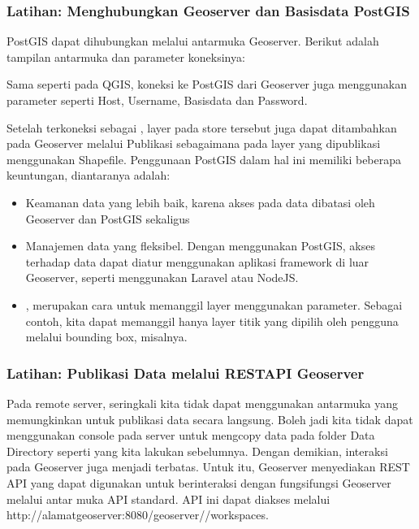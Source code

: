 \documentclass[letterpaper,10pt,english]{sphinxmanual}
\begin{document}
\subsubsection{Latihan: Menghubungkan Geoserver dan Basisdata PostGIS}
\label{\detokenize{sesi3/publikasi:latihan-menghubungkan-geoserver-dan-basisdata-postgis}}
PostGIS dapat dihubungkan melalui antarmuka Geoserver. Berikut adalah tampilan antarmuka dan parameter koneksinya:


Sama seperti pada QGIS, koneksi ke PostGIS dari Geoserver juga menggunakan parameter seperti Host, Username, Basisdata dan Password.

Setelah terkoneksi sebagai , layer pada store tersebut juga dapat ditambahkan pada Geoserver melalui Publikasi sebagaimana pada layer yang dipublikasi menggunakan Shapefile. Penggunaan PostGIS dalam hal ini memiliki beberapa keuntungan, diantaranya adalah:
\begin{itemize}
\item {} 
Keamanan data yang lebih baik, karena akses pada data dibatasi oleh Geoserver dan PostGIS sekaligus

\item {} 
Manajemen data yang fleksibel. Dengan menggunakan PostGIS, akses terhadap data dapat diatur menggunakan aplikasi framework di luar Geoserver, seperti menggunakan Laravel atau NodeJS.

\item {} 
, merupakan cara untuk memanggil layer menggunakan parameter. Sebagai contoh, kita dapat memanggil hanya layer titik yang dipilih oleh pengguna melalui bounding box, misalnya.

\end{itemize}


\subsubsection{Latihan: Publikasi Data melalui REST\sphinxhyphen{}API Geoserver}
\label{\detokenize{sesi3/publikasi:latihan-publikasi-data-melalui-rest-api-geoserver}}
Pada remote server, seringkali kita tidak dapat menggunakan antarmuka yang memungkinkan untuk publikasi data secara langsung. Boleh jadi kita tidak dapat menggunakan console pada server untuk mengcopy data pada folder Data Directory seperti yang kita lakukan sebelumnya. Dengan demikian, interaksi pada Geoserver juga menjadi terbatas. Untuk itu, Geoserver menyediakan REST API yang dapat digunakan untuk berinteraksi dengan fungsi\sphinxhyphen{}fungsi Geoserver melalui antar muka API standard. API ini dapat diakses melalui http://alamatgeoserver:8080/geoserver//workspaces.
\end{document}

